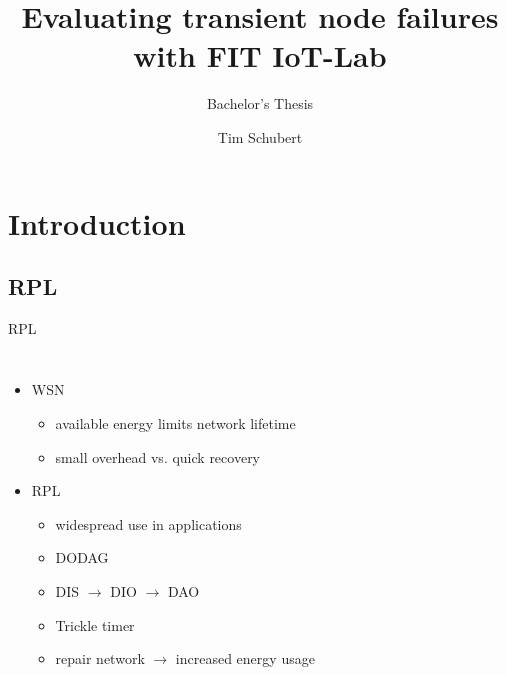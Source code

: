 \documentclass[fleqn,11pt,aspectratio=1610]{beamer}
\title{Evaluating transient node failures with FIT IoT-Lab}
\subtitle{Bachelor's Thesis}
\author{Tim Schubert}
\begin{document}
\begin{frame}[plain]
\titlepage
\end{frame}

\section{Introduction}

\subsection{RPL}
\begin{frame}{RPL}
  \begin{columns}
    \begin{itemize}
    \item <1-> WSN
      \begin{itemize}
      \item<2-> available energy limits network lifetime
      \item<3-> small overhead vs. quick recovery
      \end{itemize}
    \item<4-> RPL
      \begin{itemize}
      \item<5-> widespread use in applications
      \item<7-> DODAG
      \item<8-> DIS $\rightarrow$ DIO $\rightarrow$ DAO
      \item<11-> Trickle timer
      \item<12-> repair network $\rightarrow$ \textcolor{tubsRed}{increased energy usage}
      \end{itemize}
    \end{itemize}
    \begin{figure}
      \centering
\end{figure}
\end{columns}
\end{frame}
\end{document}
